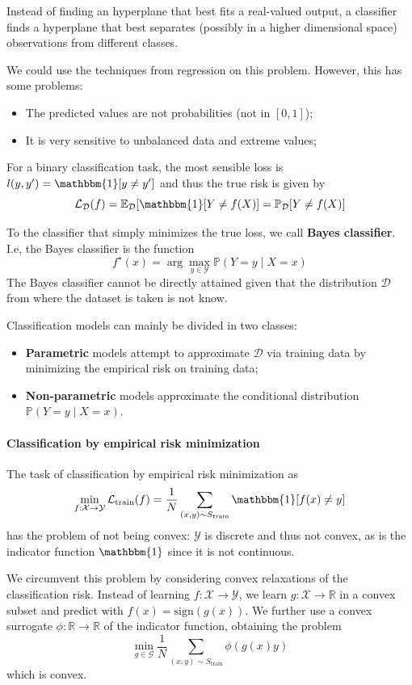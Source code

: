 \documentclass{article}
\newcommand{\R}{\mathbb{R}}
\newcommand{\prob}{\mathbb{P}}
\newcommand{\E}{\mathbb{E}}
\newcommand{\ind}{\mathbbm{1}}
\newcommand{\loss}{\mathcal{L}}
\newcommand{\dist}{\mathcal{D}}
\begin{document}
Instead of finding an hyperplane that best fits a real-valued output, a classifier finds a hyperplane that best separates (possibly in a higher dimensional space) observations from different classes.

We could use the techniques from regression on this problem.
However, this has some problems:
\begin{itemize}
    \item The predicted values are not probabilities (not in $[0,1]$);
    \item It is very sensitive to unbalanced data and extreme values;
\end{itemize}

For a binary classification task, the most sensible loss is $l(y, y') = \ind[y \neq y']$ and thus the true risk is given by
$$
\loss_\dist(f) = 
\E_\dist[\ind[Y \neq f(X)] = 
\prob_\dist[Y \neq f(X)]
$$

To the classifier that simply minimizes the true loss, we call \textbf{Bayes classifier}.
I.e, the Bayes classifier is the function
$$
f^\star(x) = \arg \max_{y \in \mathcal{Y}} \prob(Y = y \mid X = x)
$$
The Bayes classifier cannot be directly attained given that the distribution $\dist$ from where the dataset is taken is not know.

Classification models can mainly be divided in two classes:
\begin{itemize}
    \item \textbf{Parametric} models attempt to approximate $\dist$ via training data by minimizing the empirical risk on training data;
    \item \textbf{Non-parametric} models approximate the conditional distribution $\prob(Y = y \mid X = x)$.
\end{itemize}

\paragraph{Classification by empirical risk minimization}

The task of classification by empirical risk minimization as
$$
\min_{f : \mathcal{X} \to \mathcal{Y}} \loss_{\text{train}}(f) =
\frac{1}{N} \sum_{(x, y) \sim S_{\text{train}}} \ind[f(x) \neq y]
$$
has the problem of not being convex: $\mathcal{Y}$ is discrete and thus not convex, as is the indicator function $\ind$ since it is not continuous.

We circumvent this problem by considering convex relaxations of the classification risk.
Instead of learning $f : \mathcal{X} \to \mathcal{Y}$, we learn $g : \mathcal{X} \to \R$ in a convex subset and predict with $f(x) = \text{sign}(g(x))$.
We further use a convex surrogate $\phi : \R \to \R$ of the indicator function, obtaining the problem
$$
\min_{g \in \mathcal{G}} \frac{1}{N} \sum_{(x, y) \sim S_{\text{train}}} \phi(g(x) y)
$$
which is convex.
\end{document}
